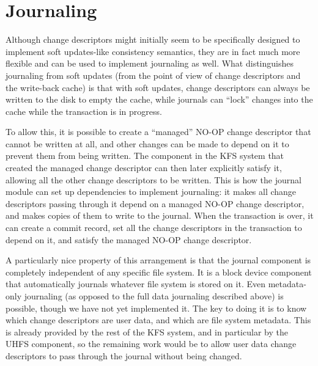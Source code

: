 \section{Journaling}
\label{sec:journal}

Although change descriptors might initially seem to be specifically designed to
implement soft updates-like consistency semantics, they are in fact much more
flexible and can be used to implement journaling as well. What distinguishes
journaling from soft updates (from the point of view of change descriptors and
the write-back cache) is that with soft updates, change descriptors can always
be written to the disk to empty the cache, while journals can ``lock'' changes
into the cache while the transaction is in progress.

To allow this, it is possible to create a ``managed'' NO-OP change descriptor
that cannot be written at all, and other changes can be made to depend on it to
prevent them from being written. The component in the KFS system that created
the managed change descriptor can then later explicitly satisfy it, allowing all
the other change descriptors to be written. This is how the journal module can
set up dependencies to implement journaling: it makes all change descriptors
passing through it depend on a managed NO-OP change descriptor, and makes copies
of them to write to the journal. When the transaction is over, it can create a
commit record, set all the change descriptors in the transaction to depend on
it, and satisfy the managed NO-OP change descriptor.

A particularly nice property of this arrangement is that the journal component
is completely independent of any specific file system. It is a block device
component that automatically journals whatever file system is stored on it. Even
metadata-only journaling (as opposed to the full data journaling described
above) is possible, though we have not yet implemented it. The key to doing it
is to know which change descriptors are user data, and which are file system
metadata. This is already provided by the rest of the KFS system, and in
particular by the UHFS component, so the remaining work would be to allow user
data change descriptors to pass through the journal without being changed.

